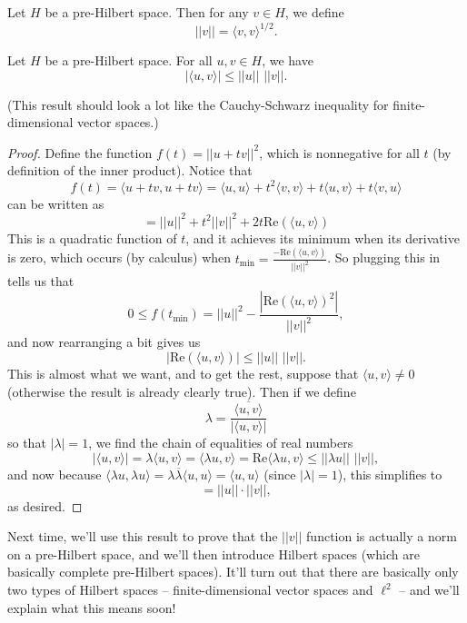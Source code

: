 \begin{definition}
Let $H$ be a pre-Hilbert space. Then for any $v \in H$, we define 
\[
    ||v|| = \langle v, v \rangle^{1/2}.
\]
\end{definition}

\begin{theorem}
Let $H$ be a pre-Hilbert space. For all $u, v \in H$, we have
\[
    \left|\langle u, v \rangle\right| \le ||u|| \,\, ||v||.
\]
\end{theorem}

(This result should look a lot like the Cauchy-Schwarz inequality for finite-dimensional vector spaces.)

\begin{proof}
Define the function $f(t) = ||u + tv||^2$, which is nonnegative for all $t$ (by definition of the inner product). Notice that 
\[
    f(t) = \langle u + tv, u + tv \rangle = \langle u, u \rangle + t^2 \langle v, v \rangle + t \langle u, v \rangle + t \langle v, u \rangle 
\]
can be written as 
\[
    = ||u||^2 + t^2||v||^2 + 2t \text{Re}(\langle u, v \rangle)
\]
This is a quadratic function of $t$, and it achieves its minimum when its derivative is zero, which occurs (by calculus) when $t_{\text{min}} = \frac{-\text{Re}(\langle u, v \rangle)}{||v||^2}$. So plugging this in tells us that
\[
    0 \le f(t_{\text{min}}) = ||u||^2 - \frac{\left|\text{Re}(\langle u, v \rangle)^2\right|}{||v||^2},
\]
and now rearranging a bit gives us 
\[
    \left|\text{Re}(\langle u, v \rangle)\right| \le ||u|| \,\, ||v||.
\]
This is almost what we want, and to get the rest, suppose that $\langle u, v \rangle \ne 0$ (otherwise the result is already clearly true). Then if we define
\[
    \lambda = \frac{\overline{\langle u, v \rangle}}{|\langle u, v \rangle|}
\]
so that $|\lambda| = 1$, we find the chain of equalities of real numbers
\[
    \boxed{|\langle u, v \rangle|} = \lambda \langle u, v \rangle = \langle \lambda u, v \rangle = \text{Re}\langle \lambda u, v \rangle \le ||\lambda u|| \,\, ||v||,
\]
and now because $\langle \lambda u, \lambda u \rangle = \lambda \overline{\lambda} \langle u, u \rangle = \langle u, u \rangle$ (since $|\lambda| = 1$), this simplifies to
\[
    = \boxed{||u|| \cdot ||v||},
\]
as desired.
\end{proof}

Next time, we'll use this result to prove that the $||v||$ function is actually a norm on a pre-Hilbert space, and we'll then introduce Hilbert spaces (which are basically complete pre-Hilbert spaces). It'll turn out that there are basically only two types of Hilbert spaces -- finite-dimensional vector spaces and $\ell^2$ -- and we'll explain what this means soon!
